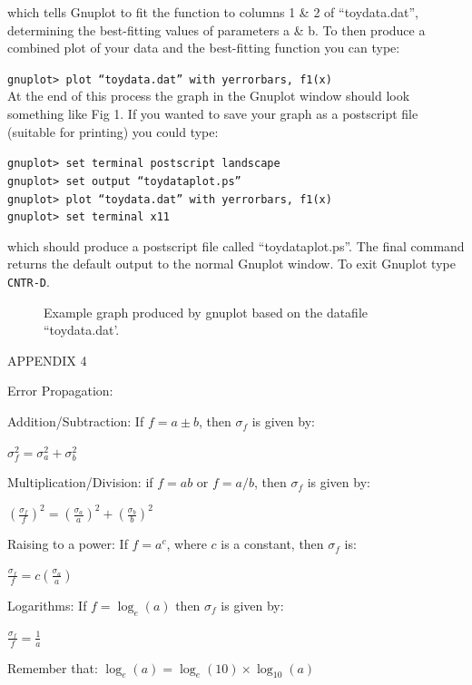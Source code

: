 \documentclass[12pt]{article}
\begin{document}
which tells Gnuplot to fit the function to columns 1 \& 2 of
``toydata.dat'', determining the best-fitting values of parameters a
\& b. To then produce a combined plot of your data and the best-fitting
function you can type:

{\tt gnuplot> plot ``toydata.dat'' with yerrorbars, f1(x)}\\
\newpage
At the end of this process the graph in the Gnuplot window should look
something like Fig 1. If you wanted to save your graph as a postscript
file (suitable for printing) you could type:

{\tt gnuplot> set terminal postscript landscape}\\
{\tt gnuplot> set output ``toydataplot.ps''}\\
{\tt gnuplot> plot ``toydata.dat'' with yerrorbars, f1(x)}\\
{\tt gnuplot> set terminal x11}

which should produce a postscript file called ``toydataplot.ps''. The
final command returns the default output to the normal Gnuplot
window. To exit Gnuplot type {\tt CNTR-D}.

\begin{figure}
\centerline{}
\caption{Example graph produced 
by gnuplot based on the datafile ``toydata.dat'.}
\end{figure}

\newpage

\centerline{\Huge APPENDIX 4}

\Large{Error Propagation:}\\

\bigskip

\noindent
Addition/Subtraction: If $f=a\pm b$, then $\sigma_f$ is given by:
\begin{center}
\Large {$\sigma^2_{f} = \sigma_a^2 + \sigma_b^2$}
\end{center}

\bigskip

Multiplication/Division: if $f=ab$ or $f=a/b$, then $\sigma_f$ is
given by:
\begin{center}
\Large{$\left(\frac{\sigma_f}{f}\right)^2 = \left(\frac{\sigma_a}{a}\right)^2 + \left(\frac{\sigma_b}{b}\right)^2$}
\end{center}

\bigskip

Raising to a power: If $f=a^c$, where $c$ is a constant, then
$\sigma_f$ is:
\begin{center}
\Large{$\frac{\sigma_f}{f}=c\left(\frac{\sigma_a}{a}\right)$}
\end{center}

\bigskip

Logarithms: If $f=\log_{e}(a)$ then $\sigma_f$ is given by:
\begin{center}
\Large{$\frac{\sigma_f}{f}=\frac{1}{a}$}
\end{center}
Remember that: $\log_{e}(a)=\log_{e}(10)\times \log_{10}(a)$
\end{document}
